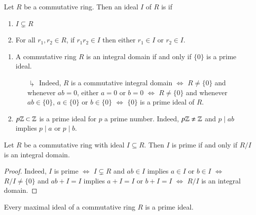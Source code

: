 \documentclass[12pt, a4paper, oneside, openright, titlepage]{book}
\begin{document}
\begin{defn}
    Let $R$ be a commutative ring. Then an ideal $I$ of $R$ is  if \begin{enumerate}
        \item $I \subsetneq R$
        \item For all $r_1,r_2 \in R$, if $r_1r_2 \in I$ then either $r_1 \in I$ or $r_2 \in I$.
    \end{enumerate}
\end{defn}

\begin{eg}
    \begin{enumerate}
        \item A commutative ring $R$ is an integral domain if and only if $\{0\}$ is a prime ideal.
        \begin{enumerate}
            \item[$\drsh$] Indeed, $R$ is a commutative integral domain $\iff$ $R \neq \{0\}$ and whenever $ab = 0$, either $a = 0$ or $b = 0$ $\iff$ $R \neq \{0\}$ and whenever $ab \in \{0\}$, $a \in \{0\}$ or $b \in \{0\}$ $\iff$ $\{0\}$ is a prime ideal of $R$. 
        \end{enumerate}
        \item $p\mathbb Z \subset \mathbb Z$ is a prime ideal for $p$ a prime number. Indeed, $p\mathbb Z \neq \mathbb Z$ and $p \;\vert\;ab$ implies $p \;\vert \;a$ or $p\;\vert\;b$.
    \end{enumerate}
\end{eg}

\begin{prop}
    Let $R$ be a commutative ring with ideal $I \subseteq R$. Then $I$ is prime if and only if $R/I$ is an integral domain.
    \begin{proof}
        Indeed, $I$ is prime $\iff$ $I \subsetneq R$ and $ab \in I$ implies $a \in I$ or $b \in I$ $\iff$ $R/I \neq \{0\}$ and $ab+I = I$ implies $a + I = I$ or $b + I = I$ $\iff$ $R/I$ is an integral domain.
    \end{proof}
\end{prop}

\begin{cor}
    Every maximal ideal of a commutative ring $R$ is a prime ideal.
\end{cor}
\end{document}
